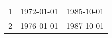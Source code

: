 % 
\begin{tabular}{ccc}
  \hline
  \hline
1 & 1972-01-01 & 1985-10-01 \\ 
  2 & 1976-01-01 & 1987-10-01 \\ 
   \hline
\end{tabular}
